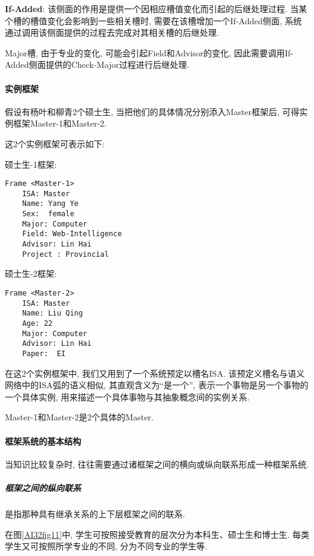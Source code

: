 \textbf{If-Added}: 该侧面的作用是提供一个因相应槽值变化而引起的后继处理过程. 当某个槽的槽值变化会影响到一些相关槽时, 需要在该槽增加一个If-Added侧面, 系统通过调用该侧面提供的过程去完成对其相关槽的后继处理.
\begin{example}
  Major槽, 由于专业的变化, 可能会引起Field和Advisor的变化, 因此需要调用If-Added侧面提供的Check-Major过程进行后继处理.
\end{example}
\paragraph{实例框架}
\begin{example}
  假设有杨叶和柳青2个硕士生, 当把他们的具体情况分别添入Master框架后, 可得实例框架Master-1和Master-2.
\end{example}
这2个实例框架可表示如下:

硕士生-1框架:
\begin{Verbatim}
Frame <Master-1>
    ISA: Master
    Name: Yang Ye
    Sex:  female
    Major: Computer
    Field: Web-Intelligence
    Advisor: Lin Hai
    Project : Provincial
\end{Verbatim}

硕士生-2框架:
\begin{Verbatim}
Frame <Master-2>
    ISA: Master
    Name: Liu Qing
    Age: 22
    Major: Computer
    Advisor: Lin Hai
    Paper:  EI
\end{Verbatim}
在这2个实例框架中, 我们又用到了一个系统预定以槽名ISA. 该预定义槽名与语义网络中的ISA弧的语义相似, 其直观含义为“是一个”, 表示一个事物是另一个事物的一个具体实例, 用来描述一个具体事物与其抽象概念间的实例关系.
\begin{example}
  Master-1和Master-2是2个具体的Master.
\end{example}
\paragraph{框架系统的基本结构}
当知识比较复杂时, 往往需要通过诸框架之间的横向或纵向联系形成一种框架系统.
\subparagraph{框架之间的纵向联系}
是指那种具有继承关系的上下层框架之间的联系.
\begin{example}
  在图\ref{AI32fig11}中, 学生可按照接受教育的层次分为本科生、硕士生和博士生. 每类学生又可按照所学专业的不同, 分为不同专业的学生等.
\end{example}

